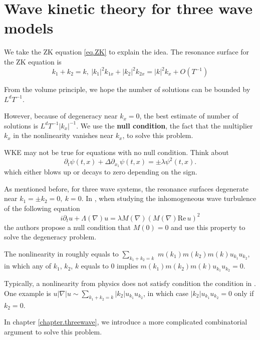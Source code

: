 \section{Wave kinetic theory for three wave models}

We take the ZK equation \eqref{eq.ZK} to explain the idea. The resonance surface for the ZK equation is 
\begin{equation}
    k_1 + k_2 = k,\ |k_1|^2k_{1x} + |k_2|^2k_{2x} = |k|^2k_{x} + O(T^{-1})
\end{equation}

From the volume principle, we hope the number of solutions can be bounded by $L^d T^{-1}$.



However, because of degeneracy near $k_x = 0$, the best estimate of number of solutions is $L^d T^{-1} |k_x|^{-1}$. We use the \textbf{null condition}, the fact that the multiplier $k_x$ in the nonlinearity vanishes near $k_x$, to solve this problem. 

WKE may not be true for equations with no null condition. Think about
\begin{equation}
    \partial_t\psi(t,x)+\Delta\partial_{x_1}\psi(t,x)=\pm\lambda \psi^2(t,x).
\end{equation}
which either blows up or decays to zero depending on the sign.
    

As mentioned before, for three wave systems, the resonance surfaces degenerate near $k_1 = \pm k_2 = 0,\ k=0$. In \cite{ampatzoglou2021derivation}, when studying the inhomogeneous wave turbulence of the following equation
\begin{equation}
    i\partial_t u + \Lambda(\nabla)u = \lambda M(\nabla)(M(\nabla)\text{Re}\, u)^2
\end{equation}
the authors propose a null condition that $M(0) = 0$ and use this property to solve the degeneracy problem.
    

    
The nonlinearity in \cite{ampatzoglou2021derivation} roughly equals to $\sum_{k_1+k_2=k}$ $m(k_1)m(k_2)m(k)u_{k_1}u_{k_2}$, in which any of $k_1$, $k_2$, $k$ equals to $0$ implies $m(k_1)m(k_2)m(k)u_{k_1}u_{k_2} = 0$.

Typically, a nonlinearity from physics does not satisfy condition the condition in \cite{ampatzoglou2021derivation}. One example is $u|\nabla|u\sim\sum_{k_1+k_2=k}|k_2|u_{k_1}u_{k_2}$, in which case $|k_2|u_{k_1}u_{k_2}=0$ only if $k_2 = 0$. 

In chapter \ref{chapter.threewave}, we introduce a more complicated combinatorial argument to solve this problem.
